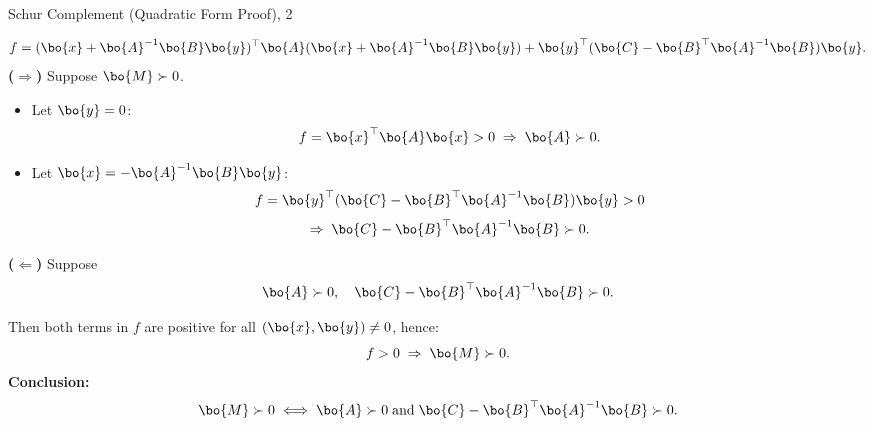 \documentclass{beamer}
\begin{document}
\begin{frame}{Schur Complement (Quadratic Form Proof), 2}
	\begin{flushleft}
		{\small
			\textcolor{mygray}{
				\[
				f = 
				(\bo{x} + \bo{A}^{-1}\bo{B}\bo{y})^\top 
				\bo{A} 
				(\bo{x} + \bo{A}^{-1}\bo{B}\bo{y})
				+ \bo{y}^\top (\bo{C} - \bo{B}^\top \bo{A}^{-1}\bo{B}) \bo{y}.
				\]
			}
			\textbf{($\Rightarrow$)} Suppose $\bo{M} \succ 0$.
			\begin{itemize}
				\item Let $\bo{y} = 0$:
				\[
				f = \bo{x}^\top \bo{A} \bo{x} > 0 \;\Rightarrow\; \bo{A} \succ 0.
				\]
				
				\item Let $\bo{x} = -\bo{A}^{-1}\bo{B}\bo{y}$:
				\[
				f = \bo{y}^\top (\bo{C} - \bo{B}^\top \bo{A}^{-1}\bo{B}) \bo{y} > 0
				\]
				\[
				\Rightarrow\; \bo{C} - \bo{B}^\top \bo{A}^{-1}\bo{B} \succ 0.
				\]
			\end{itemize}
			\textbf{($\Leftarrow$)} Suppose 
			\[
			\bo{A} \succ 0, \quad 
			\bo{C} - \bo{B}^\top \bo{A}^{-1}\bo{B} \succ 0.
			\]
			
			Then both terms in $f$ are positive for all $(\bo{x},\bo{y}) \neq 0$, hence:
			\[
			f > 0 \;\Rightarrow\; \bo{M} \succ 0.
			\]
			\textbf{Conclusion:}
			\[
			\bo{M} \succ 0 
			\;\Longleftrightarrow\;
			\bo{A} \succ 0 \;\text{and}\;
			\bo{C} - \bo{B}^\top \bo{A}^{-1}\bo{B} \succ 0.
			\]}
		
	\end{flushleft}
\end{frame}
\end{document}
